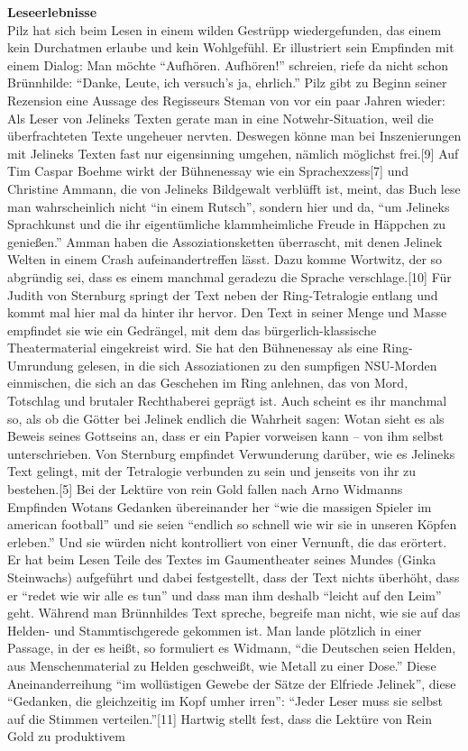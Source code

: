 \documentclass[fontsize=12pt]{scrartcl}
\begin{document}
\textbf{Leseerlebnisse}\\
Pilz hat sich beim Lesen in einem wilden Gestr\"upp wiedergefunden, das einem kein Durchatmen erlaube und kein Wohlgef\"uhl. Er illustriert sein Empfinden mit einem Dialog: Man m\"ochte "`Aufh\"oren. Aufh\"oren!"' schreien, riefe da nicht schon Br\"unnhilde: "`Danke, Leute, ich versuch's ja, ehrlich."' Pilz gibt zu Beginn seiner Rezension eine Aussage des Regisseurs Steman von vor ein paar Jahren wieder: Als Leser von Jelineks Texten gerate man in eine Notwehr-Situation, weil die \"uber\-frach\-te\-ten Texte ungeheuer nervten. Deswegen k\"onne man bei Inszenierungen mit Jelineks Texten fast nur eigensinning umgehen, n\"amlich m\"oglichst frei.[9] Auf Tim Caspar Boehme wirkt der B\"uhnenessay wie ein Sprachexzess[7] und Christine Ammann, die von Jelineks Bildgewalt verbl\"ufft ist, meint, das Buch lese man wahrscheinlich nicht "`in einem Rutsch"', sondern \mbox{hier} und da, "`um Jelineks Sprachkunst und die ihr eigent\"umliche klammheimliche Freude in H\"appchen zu genie{\ss}en."' Amman haben die Assoziationsketten \"uberrascht, mit denen Jelinek Welten in einem Crash aufeinandertreffen l\"asst. Dazu komme Wortwitz, der so abgr\"undig sei, dass es einem manchmal geradezu die Sprache verschlage.[10] F\"ur Judith von Sternburg springt der Text neben der Ring-Tetralogie entlang und kommt mal \mbox{hier} mal da hinter ihr hervor. Den Text in seiner Menge und Masse empfindet sie wie ein Gedr\"angel, mit dem das b\"urgerlich-klassische Theatermaterial eingekreist wird. Sie hat den B\"uhnenessay als eine Ring-Umrundung gelesen, in die sich Assoziationen zu den sumpfigen NSU-Morden einmischen, die sich an das Geschehen im Ring anlehnen, das von Mord, Totschlag und brutaler Rechthaberei gepr\"agt ist. Auch scheint es ihr manchmal so, als ob die G\"otter bei Jelinek endlich die Wahrheit sagen: Wotan sieht es als Beweis seines Gottseins an, dass er ein Papier vorweisen kann -- von ihm \mbox{selbst} unterschrieben. Von Sternburg empfindet Verwunderung dar\"uber, wie es Jelineks Text gelingt, mit der Tetralogie verbunden zu sein und jenseits von ihr zu bestehen.[5] Bei der Lekt\"ure von rein Gold fallen nach Arno Widmanns Empfinden Wotans Gedanken \"ubereinander her "`wie die massigen Spieler im american football"' und sie seien "`endlich so schnell wie wir sie in unseren K\"opfen erleben."' Und sie w\"urden nicht kontrolliert von einer Vernunft, die das er\"ortert. Er hat beim Lesen Teile des Textes im Gaumentheater seines Mundes (Ginka Steinwachs) aufgef\"uhrt und dabei festgestellt, dass der Text nichts \"uberh\"oht, dass er "`redet wie wir alle es tun"' und dass man ihm deshalb "`leicht auf den Leim"' geht. W\"ahrend man Br\"unnhildes Text spreche, begreife man nicht, wie sie auf das Helden- und Stammtischgerede gekommen ist. Man lande pl\"otzlich in einer Passage, in der es hei{\ss}t, so formuliert es Widmann, "`die Deutschen seien Helden, aus Menschenmaterial zu Helden geschwei{\ss}t, wie Metall zu einer Dose."' Diese Aneinanderreihung "`im woll\"ustigen Gewebe der S\"atze der Elfriede Jelinek"', diese "`Gedanken, die gleichzeitig im Kopf umher irren"': "`Jeder Leser muss sie \mbox{selbst} auf die Stimmen verteilen."'[11] Hartwig stellt fest, dass die Lekt\"ure von Rein Gold zu produktivem 
\end{document}
